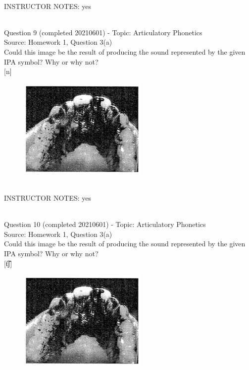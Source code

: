 \documentclass[12pt]{article}
\begin{document}
~\\
INSTRUCTOR NOTES: yes


~\\

{\large Question 9} (completed 20210601) - Topic: Articulatory Phonetics\\
Source: Homework 1, Question 3(a)\\

Could this image be the result of producing the sound represented by the given IPA symbol? Why or why not?\\

{[n]}

\begin{figure}[H]
\includegraphics{../images/staticpalatography_stop.png}
\end{figure}

~\\
INSTRUCTOR NOTES: yes


~\\

{\large Question 10} (completed 20210601) - Topic: Articulatory Phonetics\\
Source: Homework 1, Question 3(a)\\

Could this image be the result of producing the sound represented by the given IPA symbol? Why or why not?\\

{[t͡ʃ]}

\begin{figure}[H]
\includegraphics{../images/staticpalatography_stop.png}
\end{figure}
\end{document}
